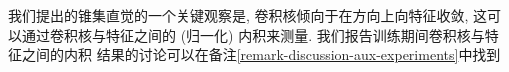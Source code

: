 我们提出的锥集直觉的一个关键观察是, 卷积核倾向于在方向上向特征收敛, 这可以通过卷积核与特征之间的 (归一化) 内积来测量.
我们报告训练期间卷积核与特征之间的内积
结果的讨论可以在备注\cref{remark-discussion-aux-experiments}中找到








